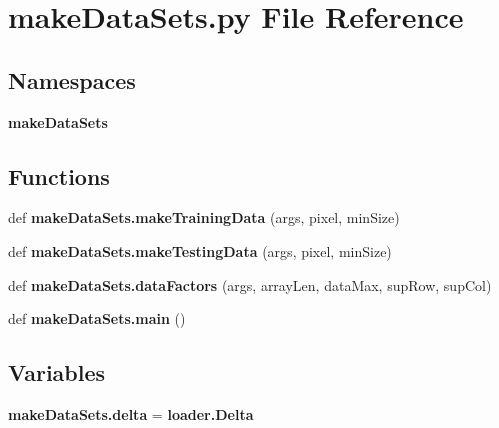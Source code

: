 \section{make\+Data\+Sets.\+py File Reference}
\label{make_data_sets_8py}
\subsection*{Namespaces}
\begin{DoxyCompactItemize}
\item 
 \textbf{ make\+Data\+Sets}
\end{DoxyCompactItemize}
\subsection*{Functions}
\begin{DoxyCompactItemize}
\item 
def \textbf{ make\+Data\+Sets.\+make\+Training\+Data} (args, pixel, min\+Size)
\item 
def \textbf{ make\+Data\+Sets.\+make\+Testing\+Data} (args, pixel, min\+Size)
\item 
def \textbf{ make\+Data\+Sets.\+data\+Factors} (args, array\+Len, data\+Max, sup\+Row, sup\+Col)
\item 
def \textbf{ make\+Data\+Sets.\+main} ()
\end{DoxyCompactItemize}
\subsection*{Variables}
\begin{DoxyCompactItemize}
\item 
\textbf{ make\+Data\+Sets.\+delta} = \textbf{ loader.\+Delta}
\end{DoxyCompactItemize}
